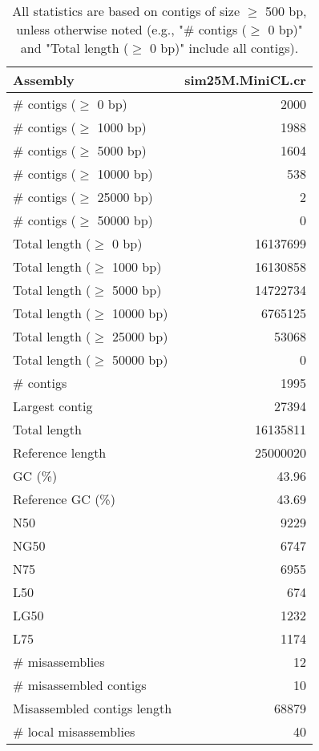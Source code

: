 \documentclass[12pt,a4paper]{article}
\begin{document}
\begin{table}[ht]
\begin{center}
\caption{All statistics are based on contigs of size $\geq$ 500 bp, unless otherwise noted (e.g., "\# contigs ($\geq$ 0 bp)" and "Total length ($\geq$ 0 bp)" include all contigs).}
\begin{tabular}{|l*{1}{|r}|}
\hline
Assembly & sim25M.MiniCL.cr \\ \hline
\# contigs ($\geq$ 0 bp) & 2000 \\ \hline
\# contigs ($\geq$ 1000 bp) & 1988 \\ \hline
\# contigs ($\geq$ 5000 bp) & 1604 \\ \hline
\# contigs ($\geq$ 10000 bp) & 538 \\ \hline
\# contigs ($\geq$ 25000 bp) & 2 \\ \hline
\# contigs ($\geq$ 50000 bp) & 0 \\ \hline
Total length ($\geq$ 0 bp) & 16137699 \\ \hline
Total length ($\geq$ 1000 bp) & 16130858 \\ \hline
Total length ($\geq$ 5000 bp) & 14722734 \\ \hline
Total length ($\geq$ 10000 bp) & 6765125 \\ \hline
Total length ($\geq$ 25000 bp) & 53068 \\ \hline
Total length ($\geq$ 50000 bp) & 0 \\ \hline
\# contigs & 1995 \\ \hline
Largest contig & 27394 \\ \hline
Total length & 16135811 \\ \hline
Reference length & 25000020 \\ \hline
GC (\%) & 43.96 \\ \hline
Reference GC (\%) & 43.69 \\ \hline
N50 & 9229 \\ \hline
NG50 & 6747 \\ \hline
N75 & 6955 \\ \hline
L50 & 674 \\ \hline
LG50 & 1232 \\ \hline
L75 & 1174 \\ \hline
\# misassemblies & 12 \\ \hline
\# misassembled contigs & 10 \\ \hline
Misassembled contigs length & 68879 \\ \hline
\# local misassemblies & 40 \\ \hline

\end{tabular}
\end{center}
\end{table}
\end{document}
